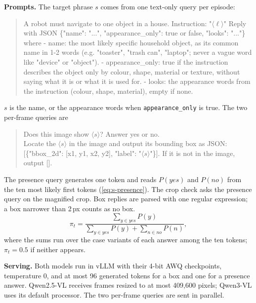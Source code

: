 \documentclass[10pt,twocolumn,letterpaper]{article}
\begin{document}
\noindent\textbf{Prompts.}
The target phrase $s$ comes from one text-only query per episode:
\begin{quote}\small\ttfamily
A robot must navigate to one object in a house. Instruction: "$\langle\ell\rangle$"
Reply with JSON \{"name": "...", "appearance\_only": true or false, "looks": "..."\} where
- name: the most likely specific household object, as its common name in 1-2 words (e.g. "toaster", "trash can",
"laptop"; never a vague word like "device" or "object").
- appearance\_only: true if the instruction describes the object only by colour, shape, material or texture,
without saying what it is or what it is used for.
- looks: the appearance words from the instruction (colour, shape, material), empty if none.
\end{quote}
$s$ is the name, or the appearance words when \texttt{appearance\_only} is true. The two per-frame queries are
\begin{quote}\small\ttfamily
Does this image show $\langle s\rangle$? Answer yes or no.\\[0.3em]
Locate the $\langle s\rangle$ in the image and output its bounding box as JSON: [\{"bbox\_2d": [x1, y1, x2, y2],
"label": "$\langle s\rangle$"\}]. If it is not in the image, output [].
\end{quote}
The presence query generates one token and reads $P(\textit{yes})$ and $P(\textit{no})$ from the ten most likely
first tokens (\cref{eq:s-presence}). The crop check asks the presence query on the magnified crop. Box replies are parsed with one regular expression; a box narrower than 2\,px counts as no box.
\begin{equation}
\pi_t=\frac{\sum_{y\in\textit{yes}}P(y)}{\sum_{y\in\textit{yes}}P(y)+\sum_{n\in\textit{no}}P(n)} ,
\label{eq:s-presence}
\end{equation}
where the sums run over the case variants of each answer among the ten tokens; $\pi_t=0.5$ if neither appears.

\noindent\textbf{Serving.}
Both models run in vLLM with their 4-bit AWQ checkpoints, temperature 0, and at most 96 generated tokens for a box
and one for a presence answer. Qwen2.5-VL receives frames resized to at most 409{,}600 pixels; Qwen3-VL uses its
default processor. The two per-frame queries are sent in parallel.
\end{document}
